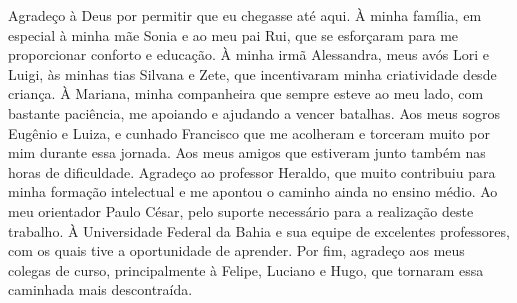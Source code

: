 
\begin{agradecimentos}[AGRADECIMENTOS]

Agradeço à Deus por permitir que eu chegasse até aqui. À minha família, em especial à minha mãe Sonia e ao meu pai Rui, que se esforçaram para me proporcionar conforto e educação. À minha irmã Alessandra, meus avós Lori e Luigi, às minhas tias Silvana e Zete, que incentivaram minha criatividade desde criança. À Mariana, minha companheira que sempre esteve ao meu lado, com bastante paciência, me apoiando e ajudando a vencer batalhas. Aos meus sogros Eugênio e Luiza, e cunhado Francisco que me acolheram e torceram muito por mim durante essa jornada. Aos meus amigos que estiveram junto também nas horas de dificuldade. Agradeço ao professor Heraldo, que muito contribuiu para minha formação intelectual e me apontou o caminho ainda no ensino médio. Ao meu orientador Paulo César, pelo suporte necessário para a realização deste trabalho. À Universidade Federal da Bahia e sua equipe de excelentes professores, com os quais tive a oportunidade de aprender. Por fim, agradeço aos meus colegas de curso, principalmente à Felipe, Luciano e Hugo, que tornaram essa caminhada mais descontraída.

\end{agradecimentos}
